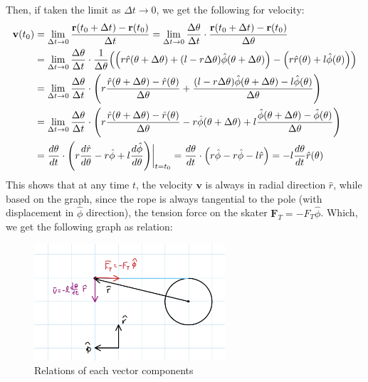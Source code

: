 \documentclass{article}
\DeclarePairedDelimiter{\paran}{(}{)}%
\newcommand{\br}{\textbf{r}} %
\newcommand{\bv}{\textbf{v}} %
\newcommand{\bF}{\textbf{F}} %
\begin{document}
Then, if taken the limit as $\Delta t\rightarrow 0$, we get the following for velocity:
\begin{align}
    \bv(t_0)&=\lim_{\Delta t\rightarrow 0}\frac{\br(t_0+\Delta t)-\br(t_0)}{\Delta t}=\lim_{\Delta t\rightarrow 0}\frac{\Delta\theta}{\Delta t}\cdot\frac{\br(t_0+\Delta t)-\br(t_0)}{\Delta\theta}\\
    &= \lim_{\Delta t\rightarrow 0}\frac{\Delta\theta}{\Delta t}\cdot\frac{1}{\Delta \theta}\paran*{\paran*{r\hat{r}(\theta+\Delta\theta)+(l-r\Delta\theta)\hat{\phi}(\theta+\Delta\theta)} - \paran*{r\hat{r}(\theta)+l\hat{\phi}(\theta)}}\\
    &= \lim_{\Delta t\rightarrow 0}\frac{\Delta\theta}{\Delta t}\cdot\paran*{
        r\frac{\hat{r}(\theta+\Delta\theta)-\hat{r}(\theta)}{\Delta\theta} + \frac{(l-r\Delta\theta)\hat{\phi}(\theta+\Delta\theta)-l\hat{\phi}(\theta)}{\Delta\theta}
    }\\
    &= \lim_{\Delta t\rightarrow 0}\frac{\Delta\theta}{\Delta t}\cdot\paran*{r\frac{\hat{r}(\theta+\Delta\theta)-\hat{r}(\theta)}{\Delta\theta} - r\hat{\phi}(\theta+\Delta\theta)+ l\frac{\hat{\phi}(\theta+\Delta\theta)-\hat{\phi}(\theta)}{\Delta\theta}}\\
    &= \frac{d\theta}{dt}\cdot \paran*{r\frac{d\hat{r}}{d\theta} - r\hat{\phi}+l\frac{d\hat{\phi}}{d\theta}}\bigg|_{t = t_0} = \frac{d\theta}{dt}\cdot\paran*{r\hat{\phi} -r\hat{\phi}-l\hat{r}} = -l\frac{d\theta}{dt}\hat{r}(\theta)
\end{align}
This shows that at any time $t$, the velocity $\bv$ is always in radial direction $\hat{r}$, while based on the graph, since the rope is always tangential to the pole (with displacement in $\hat{\phi}$ direction), the tension force on the skater $\bF_T = -F_T\hat{\phi}$. Which, we get the following graph as relation:

\begin{figure}[h!]
    \begin{center}
        \includegraphics[width=71mm]{phys103_q1a2.jpg}
        \caption{Relations of each vector components}
    \end{center}
\end{figure}
\end{document}
